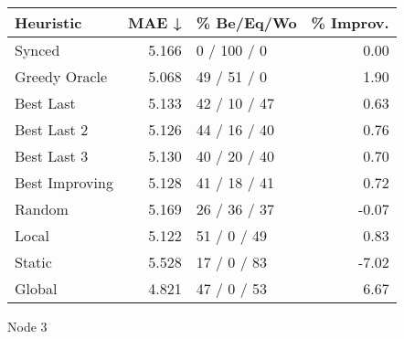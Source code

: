 \begin{tabular}{lrlr}
\toprule
\textbf{Heuristic} & \textbf{MAE ↓} & \textbf{\% Be/Eq/Wo} & \textbf{\% Improv.} \\
\midrule
            Synced &          5.166 &          0 / 100 / 0 &                0.00 \\
     Greedy Oracle &          5.068 &          49 / 51 / 0 &                1.90 \\
         Best Last &          5.133 &         42 / 10 / 47 &                0.63 \\
       Best Last 2 &          5.126 &         44 / 16 / 40 &                0.76 \\
       Best Last 3 &          5.130 &         40 / 20 / 40 &                0.70 \\
    Best Improving &          5.128 &         41 / 18 / 41 &                0.72 \\
            Random &          5.169 &         26 / 36 / 37 &               -0.07 \\
             Local &          5.122 &          51 / 0 / 49 &                0.83 \\
            Static &          5.528 &          17 / 0 / 83 &               -7.02 \\
            Global &          4.821 &          47 / 0 / 53 &                6.67 \\
\bottomrule
\end{tabular}
\caption{Node 3}
\label{tab:ds_iid_lr05_le1_bs4_3}
